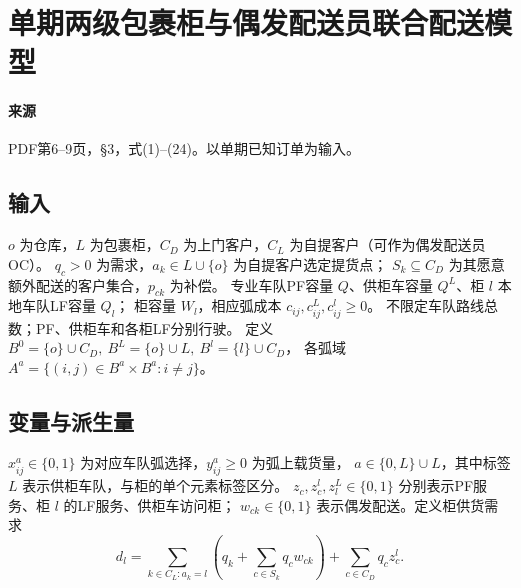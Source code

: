 \documentclass[UTF8,11pt]{ctexart}
\begin{document}
\section*{单期两级包裹柜与偶发配送员联合配送模型}

\paragraph{来源} PDF第6--9页，§3，式(1)--(24)。以单期已知订单为输入。
\subsection*{输入}
$o$ 为仓库，$L$ 为包裹柜，$C_D$ 为上门客户，$C_L$ 为自提客户（可作为偶发配送员OC）。
$q_c>0$ 为需求，$a_k\in L\cup\{o\}$ 为自提客户选定提货点；
$S_k\subseteq C_D$ 为其愿意额外配送的客户集合，$p_{ck}$ 为补偿。
专业车队PF容量 $Q$、供柜车容量 $Q^L$、柜 $l$ 本地车队LF容量 $Q_l$；
柜容量 $W_l$，相应弧成本 $c_{ij},c^L_{ij},c^l_{ij}\ge0$。
不限定车队路线总数；PF、供柜车和各柜LF分别行驶。
定义 $B^0=\{o\}\cup C_D,\ B^L=\{o\}\cup L,\ B^l=\{l\}\cup C_D$，
各弧域 $A^a=\{(i,j)\in B^a\times B^a:i\ne j\}$。
\subsection*{变量与派生量}
$x^a_{ij}\in\{0,1\}$ 为对应车队弧选择，$y^a_{ij}\ge0$ 为弧上载货量，
$a\in\{0,L\}\cup L$，其中标签 $L$ 表示供柜车队，与柜的单个元素标签区分。
$z_c,z_c^l,z_l^L\in\{0,1\}$ 分别表示PF服务、柜 $l$ 的LF服务、供柜车访问柜；
$w_{ck}\in\{0,1\}$ 表示偶发配送。定义柜供货需求
\[
d_l=\sum_{k\in C_L:a_k=l}\left(q_k+\sum_{c\in S_k}q_cw_{ck}\right)
       +\sum_{c\in C_D}q_cz_c^l .
\]
\end{document}
